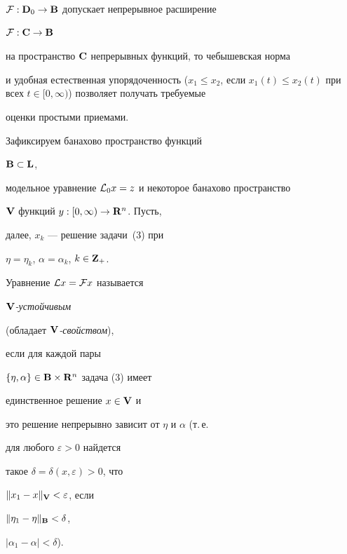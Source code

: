 ${\cal F}:\bold {D}_0\to\bold {B}$ допускает непрерывное расширение


${\cal F}:\bold {C}\to\bold {B}$


на пространство $\bold {C}$ непрерывных функций, то чебышевская норма


и удобная естественная упорядоченность ($x_1\le x_2$, если $x_1(t)\le


x_2(t)$ при всех $t\in[0,\infty)$) позволяет получать требуемые


оценки простыми приемами.





Зафиксируем банахово пространство функций


$\bold {B}\subset{\bold {L}}$,


модельное уравнение ${\cal L}_0x=z$ и некоторое банахово пространство


$\bold {V}$ функций $y:[0,\infty)\to{\bold {R}^n}$. Пусть,


далее, $x_k$ --- решение задачи~(3) при


$\eta=\eta_k$, $\alpha=\alpha_k$, $k\in\bold {Z}_+$.





\begin{defn}


Уравнение ${\cal L}x={\cal F}x$ называется


{\it $\bold {V}$-устойчивым}


(обладает {\it $\bold {V}$-свойством}),


если для каждой пары


$\{\eta,\alpha\}\in\bold {B}\times\bold {R}^n$ задача (3) имеет


единственное решение $x\in\bold {V}$ и


это решение непрерывно зависит от $\eta$ и $\alpha$ (т.\,е.


для любого $\varepsilon>0$ найдется


такое $\delta=\delta(x,\varepsilon)>0$, что


$\|x_1-x\|_{\bold V}<\varepsilon$, если


$\|\eta_1-\eta\|_{\bold B}<\delta$,


$|\alpha_1-\alpha|<\delta$).


\end{defn}





